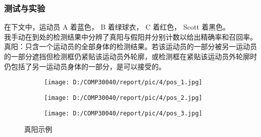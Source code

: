 \documentclass{article}
\begin{document}
\subsubsection{测试与实验}
在下文中，运动员 A 着蓝色， B 着绿球衣， C 着红色， Scott 着黑色。\\
我手动在到处的检测结果中分辨了真阳与假阳并分别计数以给出精确率和召回率。\\
真阳：只含一个运动员的全部身体的检测结果。若该运动员的一部分被另一运动员的一部分遮挡但检测框仍紧贴该运动员外轮廓，或检测框在紧贴该运动员外轮廓时仍包括了另一运动员身体的一部分，是可以接受的。\\
\begin{figure}[h!]
\centering
  \begin{subfigure}[b]{0.15\linewidth}
  \centering
    \texttt{[image: D:/COMP30040/report/pic/4/pos\_1.jpg]} 
    \caption{}
  \end{subfigure}
  \begin{subfigure}[b]{0.15\linewidth}
  \centering
    \texttt{[image: D:/COMP30040/report/pic/4/pos\_2.jpg]} 
    \caption{}
  \end{subfigure}
  \begin{subfigure}[b]{0.15\linewidth}
  \centering
    \texttt{[image: D:/COMP30040/report/pic/4/pos\_3.jpg]}
    \caption{} 
  \end{subfigure}
  \caption{真阳示例}
\end{figure}
\end{document}
